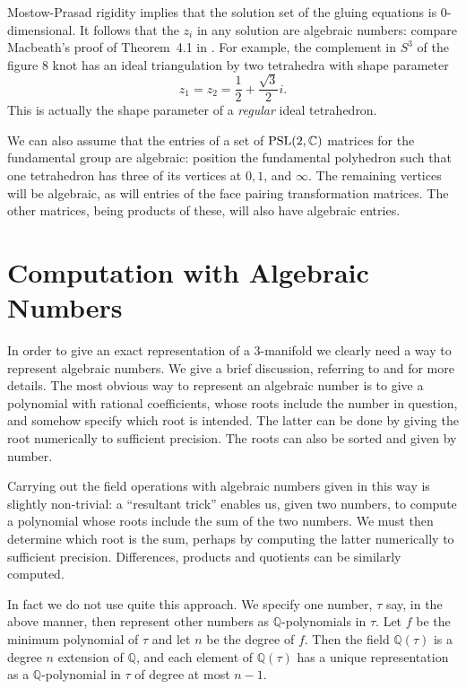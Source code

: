 \documentclass[a4paper]{amsart}
\def\Q{{\mathbb Q}}
\def\C{{\mathbb C}}
\def\psl2c{\mbox{\rm PSL}(2,\C)}
\theoremstyle{definition}
\begin{document}
Mostow-Prasad rigidity \cite{mostow} implies that the solution set of
the gluing equations is 0-dimensional. It follows that the $z_i$ in
any solution are algebraic numbers: compare Macbeath's proof of Theorem~4.1
in \cite{macbeath}. For example, the complement in $S^3$ of the figure 8
knot has an ideal triangulation by two tetrahedra with shape
parameter
$$
z_1 = z_2 = \frac{1}{2} + \frac{\sqrt 3}{2}i.
$$
This is actually the shape parameter of a {\em regular} ideal tetrahedron. 

We can also assume that the entries of a set of $\psl2c$ matrices
for the fundamental group are algebraic: position the
fundamental polyhedron such that one tetrahedron has three of its vertices at
$0,1$, and $\infty$. The remaining vertices will be algebraic, as
will entries of the face pairing transformation matrices. The other
matrices, being products of these, will also have algebraic entries. 


\section{Computation with Algebraic Numbers}

In order to give an exact representation of a 3-manifold we clearly
need a way to represent algebraic numbers. We give a brief discussion,
referring to \cite{cohen} and \cite{pohst} for more details.
The most obvious way to
represent an algebraic number is to give a polynomial with rational
coefficients, whose roots include the number in
question, and somehow specify which root is intended. The latter can be done
by giving the root numerically to sufficient precision. The roots can
also be sorted and given by number.

Carrying out the field operations with algebraic numbers given in this
way is slightly non-trivial: a ``resultant trick'' enables us, given
two numbers, to compute a polynomial whose roots include the sum of
the two numbers. We must then determine which root is the sum, perhaps
by computing the latter numerically to sufficient
precision. Differences, products and quotients can be similarly
computed.

In fact we do not use quite this approach. We specify one number,
$\tau$ say, in
the above manner, then represent other numbers as $\Q$-polynomials 
in $\tau$. Let $f$ be the minimum polynomial of $\tau$ and let $n$ be
the degree of $f$. Then the field $\Q(\tau)$ is a degree $n$ extension 
of $\Q$, and
each element of $\Q(\tau)$ has a unique representation as a
$\Q$-polynomial in $\tau$ of degree at most $n-1$. 
\end{document}

